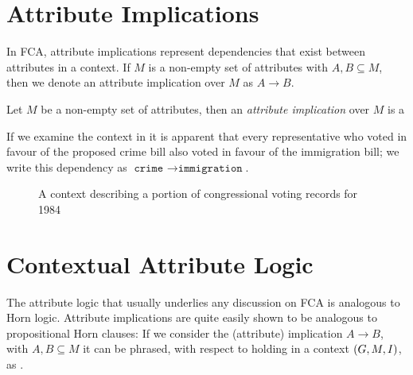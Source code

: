 \section{Attribute Implications}
\label{section:attribute-implications}

In FCA, attribute implications represent dependencies that exist between attributes in a context. If $M$ is a non-empty set of attributes with $A, B \subseteq M$, then we denote an attribute implication
over $M$ as $A \rightarrow B$.

\begin{definition}
  \label{definition:attribute-implication} Let $M$ be a non-empty set of attributes, then an \emph{attribute implication} over $M$ is a
\end{definition}

If we examine the context in  it is apparent that every representative who voted in favour of the proposed crime bill also voted in favour of the immigration bill; we
write this dependency as $\texttt{crime }\rightarrow \texttt{immigration}$.

\begin{figure}[H]
  \centering
  \begin{cxt}
          
        
  \end{cxt}
  \caption{A context describing a portion of congressional voting records for 1984}
  \label{context:voting-records-small}
\end{figure}

\section{Contextual Attribute Logic}
\label{section:contextual-attribute-logic}

The attribute logic that usually underlies any discussion on FCA is analogous to Horn logic. Attribute implications are quite easily shown to be analogous to propositional Horn clauses: If we consider
the (attribute) implication $A \rightarrow B$, with $A, B \subseteq M$ it can be phrased, with respect to holding in a context $(G,M,\mathrel{I})$, as .

